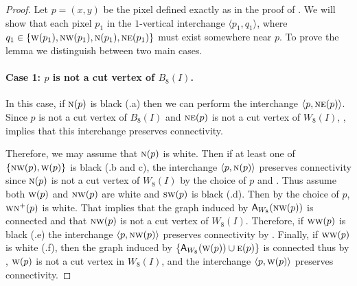 \documentclass[lotsofwhite,charterfonts]{patmorin}
\newcommand{\N}{\textsc{n}}
\newcommand{\NE}{\textsc{ne}}
\newcommand{\E}{\textsc{e}}
\renewcommand{\S}{\textsc{s}}
\newcommand{\SW}{\textsc{sw}}
\newcommand{\W}{\textsc{w}}
\newcommand{\NW}{\textsc{nw}}
\newcommand{\x}{\ensuremath{\protect\textup{\textsf{x}}}}
\newcommand{\ic}[2]{\langle #1,#2 \rangle}
\newcommand{\A}[2]{\ensuremath{\protect\textup{\textsf{A}}_{#2}(#1)}}
\begin{document}
\begin{proof}
Let $p=(x,y)$ be the pixel defined exactly as in the proof of
.
%
We will show that each pixel $p_1$ in the $1$-vertical interchange
$\ic{p_1}{q_1}$, where $q_1\in\{\W(p_1),\NW(p_1),\N(p_1),\NE(p_1)\}$
must exist somewhere near $p$. To prove the lemma we distinguish
between two main cases.


\paragraph{Case 1: $p$ is not a cut vertex of $B_8(I)$.} 

In this case, if $\N(p)$ is black (.a) then we can
perform the interchange $\ic{p}{\NE(p)}$.  Since $p$ is not a cut
vertex of $B_8(I)$ and $\NE(p)$ is not a cut vertex of $W_8(I)$,
, implies that this interchange preserves
connectivity.

Therefore, we may assume that $\N(p)$ is white. Then if at least one
of $\{\NW(p), \W(p)\}$ is black (.b and c), the
interchange $\ic{p}{\N(p)}$ preserves connectivity since $\N(p)$ is
not a cut vertex of $W_8(I)$ by the choice of $p$ and
. Thus assume both $\W(p)$ and $\NW(p)$ are white and
$\SW(p)$ is black (.d). Then by the choice of $p$,
$\W\N^+(p)$ is white. That implies that the graph induced by
\A{\NW(p)}{W_8} is connected and that $\NW(p)$ is not a cut vertex of
$W_8(I)$. Therefore, if $\W\W(p)$ is black  (.e) the
interchange $\ic{p}{\NW(p)}$ preserves connectivity by
. Finally, if $\W\W(p)$ is white
(.f), then the graph induced by $\{\A{\W(p)}{W_8}\cup
\E(p)\}$ is connected thus by , $\W(p)$ is not a cut
vertex in $W_8(I)$, and the interchange $\ic{p}{\W(p)}$ preserves
connectivity.


\end{proof}
\end{document}
